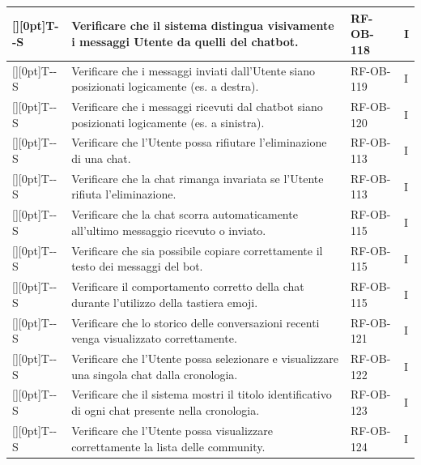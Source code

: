 \documentclass[a4paper,12pt]{article}
\newcounter{testsys}
\newcommand{\systestcode}{%
  \raisebox{0pt}[\height][0pt]{\hypertarget{T-\arabic{testsys}-S}{}}T-\arabic{testsys}-S%
}
\begin{document}
\begin{longtable}{| >{\centering\arraybackslash}p{} | >{\raggedright\arraybackslash}p{} | >{\centering\arraybackslash}p{} | >{\centering\arraybackslash}p{} |}
\stepcounter{testsys} \systestcode & Verificare che il sistema distingua visivamente i messaggi Utente da quelli del chatbot. & RF-OB-118 & I \\
\hline

\stepcounter{testsys} \systestcode & Verificare che i messaggi inviati dall'Utente siano posizionati logicamente (es. a destra). & RF-OB-119 & I \\
\hline

\stepcounter{testsys} \systestcode & Verificare che i messaggi ricevuti dal chatbot siano posizionati logicamente (es. a sinistra). & RF-OB-120 & I \\
\hline

\stepcounter{testsys} \systestcode & Verificare che l'Utente possa rifiutare l'eliminazione di una chat. & RF-OB-113 & I \\
\hline

\stepcounter{testsys} \systestcode & Verificare che la chat rimanga invariata se l'Utente rifiuta l'eliminazione. & RF-OB-113 & I \\
\hline

\stepcounter{testsys} \systestcode & Verificare che la chat scorra automaticamente all'ultimo messaggio ricevuto o inviato. & RF-OB-115 & I \\
\hline

\stepcounter{testsys} \systestcode & Verificare che sia possibile copiare correttamente il testo dei messaggi del bot. & RF-OB-115 & I \\
\hline

\stepcounter{testsys} \systestcode & Verificare il comportamento corretto della chat durante l'utilizzo della tastiera emoji. & RF-OB-115 & I \\
\hline

\stepcounter{testsys} \systestcode & Verificare che lo storico delle conversazioni recenti venga visualizzato correttamente. & RF-OB-121 & I \\
\hline

\stepcounter{testsys} \systestcode & Verificare che l'Utente possa selezionare e visualizzare una singola chat dalla cronologia. & RF-OB-122 & I \\
\hline

\stepcounter{testsys} \systestcode & Verificare che il sistema mostri il titolo identificativo di ogni chat presente nella cronologia. & RF-OB-123 & I \\
\hline

\stepcounter{testsys} \systestcode & Verificare che l'Utente possa visualizzare correttamente la lista delle community. & RF-OB-124 & I \\
\hline


\end{longtable}
\end{document}
